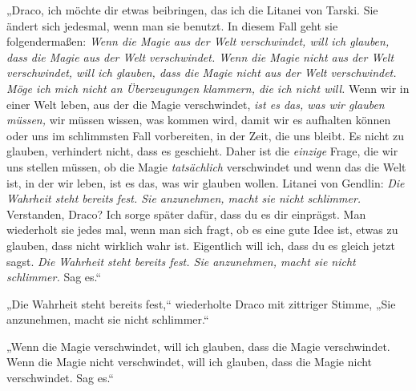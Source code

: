 „Draco, ich möchte dir etwas beibringen, das ich die Litanei von Tarski. Sie ändert sich jedesmal, wenn man sie benutzt. In diesem Fall geht sie folgendermaßen: \emph{Wenn die Magie aus der Welt verschwindet, will ich glauben, dass die Magie aus der Welt verschwindet. Wenn die Magie nicht aus der Welt verschwindet, will ich glauben, dass die Magie nicht aus der Welt verschwindet. Möge ich mich nicht an Überzeugungen klammern, die ich nicht will.} Wenn wir in einer Welt leben, aus der die Magie verschwindet, \emph{ist es das, was wir glauben müssen,} wir müssen wissen, was kommen wird, damit wir es aufhalten können oder uns im schlimmsten Fall vorbereiten, in der Zeit, die uns bleibt. Es nicht zu glauben, verhindert nicht, dass es geschieht. Daher ist die \emph{einzige} Frage, die wir uns stellen müssen, ob die Magie \emph{tatsächlich} verschwindet und wenn das die Welt ist, in der wir leben, ist es das, was wir glauben wollen. Litanei von Gendlin: \emph{Die Wahrheit steht bereits fest. Sie anzunehmen, macht sie nicht schlimmer.} Verstanden, Draco? Ich sorge später dafür, dass du es dir einprägst. Man wiederholt sie jedes mal, wenn man sich fragt, ob es eine gute Idee ist, etwas zu glauben, dass nicht wirklich wahr ist. Eigentlich will ich, dass du es gleich jetzt sagst. \emph{Die Wahrheit steht bereits fest. Sie anzunehmen, macht sie nicht schlimmer.} Sag es.“%

„Die Wahrheit steht bereits fest,“ wiederholte Draco mit zittriger Stimme, „Sie anzunehmen, macht sie nicht schlimmer.“

„Wenn die Magie verschwindet, will ich glauben, dass die Magie verschwindet. Wenn die Magie nicht verschwindet, will ich glauben, dass die Magie nicht verschwindet. Sag es.“

